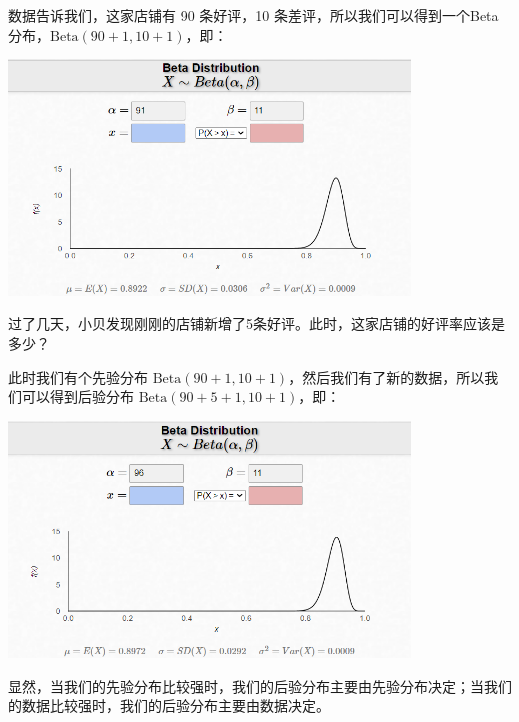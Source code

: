 \documentclass[UTF8]{ctexart}
\begin{document}
\begin{Answer}
	数据告诉我们，这家店铺有 90 条好评，10 条差评，所以我们可以得到一个Beta分布，$\text{Beta}(90+1, 10+1)$，即：

	\begin{center}
		\includegraphics[width=0.8\textwidth]{fig13.png}
	\end{center}

\end{Answer}

\begin{Exercise}
	过了几天，小贝发现刚刚的店铺新增了5条好评。此时，这家店铺的好评率应该是多少？
\end{Exercise}

\begin{Answer}
	此时我们有个先验分布 $\text{Beta}(90+1, 10+1)$，然后我们有了新的数据，所以我们可以得到后验分布 $\text{Beta}(90+5+1, 10+1)$，即：

	\begin{center}
		\includegraphics[width=0.8\textwidth]{fig14.png}
	\end{center}

\end{Answer}

显然，当我们的先验分布比较强时，我们的后验分布主要由先验分布决定；当我们的数据比较强时，我们的后验分布主要由数据决定。
\end{document}
